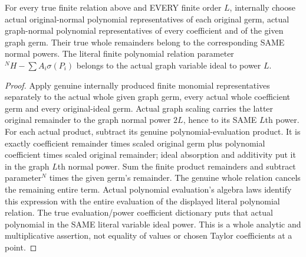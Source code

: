 \begin{lemma}
\label{hir:relative-normal-graph-relations-internal-finite-jets}
\leanok
For every true finite relation above and EVERY finite order $L$, internally choose actual original-normal polynomial representatives of each original germ, actual graph-normal polynomial representatives of every coefficient and of the given graph germ. Their true whole remainders belong to the corresponding SAME normal powers. The literal finite polynomial relation parameter$^N H-\sum A_i\sigma(P_i)$ belongs to the actual graph variable ideal to power $L$.
\end{lemma}
\begin{proof}
Apply genuine internally produced finite monomial representatives separately to the actual whole given graph germ, every actual whole coefficient germ and every original-ideal germ. Actual graph scaling carries the latter original remainder to the graph normal power $2L$, hence to its SAME $L$th power. For each actual product, subtract its genuine polynomial-evaluation product. It is exactly coefficient remainder times scaled original germ plus polynomial coefficient times scaled original remainder; ideal absorption and additivity put it in the graph $L$th normal power. Sum the finite product remainders and subtract parameter$^N$ times the given germ's remainder. The genuine whole relation cancels the remaining entire term. Actual polynomial evaluation's algebra laws identify this expression with the entire evaluation of the displayed literal polynomial relation. The true evaluation/power coefficient dictionary puts that actual polynomial in the SAME literal variable ideal power. This is a whole analytic and multiplicative assertion, not equality of values or chosen Taylor coefficients at a point.
\end{proof}

